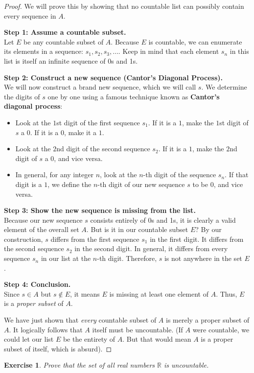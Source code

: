 \documentclass{article}
\theoremstyle{mythm}
\newtheorem{exercise}{Exercise}
\begin{document}
\begin{proof}
We will prove this by showing that no countable list can possibly contain every sequence in $A$.

\textbf{Step 1: Assume a countable subset.} \\
Let $E$ be any countable subset of $A$. Because $E$ is countable, we can enumerate its elements in a sequence: $s_1, s_2, s_3, \dots$. Keep in mind that each element $s_n$ in this list is itself an infinite sequence of 0s and 1s.

\textbf{Step 2: Construct a new sequence (Cantor's Diagonal Process).} \\
We will now construct a brand new sequence, which we will call $s$. We determine the digits of $s$ one by one using a famous technique known as \textbf{Cantor's diagonal process}:
\begin{itemize}
    \item Look at the $1$st digit of the first sequence $s_1$. If it is a $1$, make the $1$st digit of $s$ a $0$. If it is a $0$, make it a $1$.
    \item Look at the $2$nd digit of the second sequence $s_2$. If it is a $1$, make the $2$nd digit of $s$ a $0$, and vice versa.
    \item In general, for any integer $n$, look at the $n$-th digit of the sequence $s_n$. If that digit is a $1$, we define the $n$-th digit of our new sequence $s$ to be $0$, and vice versa.
\end{itemize}

\textbf{Step 3: Show the new sequence is missing from the list.} \\
Because our new sequence $s$ consists entirely of 0s and 1s, it is clearly a valid element of the overall set $A$. But is it in our countable subset $E$? 
By our construction, $s$ differs from the first sequence $s_1$ in the first digit. It differs from the second sequence $s_2$ in the second digit. In general, it differs from every sequence $s_n$ in our list at the $n$-th digit. Therefore, $s$ is not anywhere in the set $E$. 

\textbf{Step 4: Conclusion.} \\
Since $s \in A$ but $s \notin E$, it means $E$ is missing at least one element of $A$. Thus, $E$ is a \textit{proper subset} of $A$. 

We have just shown that \textit{every} countable subset of $A$ is merely a proper subset of $A$. It logically follows that $A$ itself must be uncountable. (If $A$ were countable, we could let our list $E$ be the entirety of $A$. But that would mean $A$ is a proper subset of itself, which is absurd).
\end{proof}
\begin{exercise}
Prove that the set of all real numbers $\mathbb{R}$ is uncountable.
\end{exercise}
\end{document}
